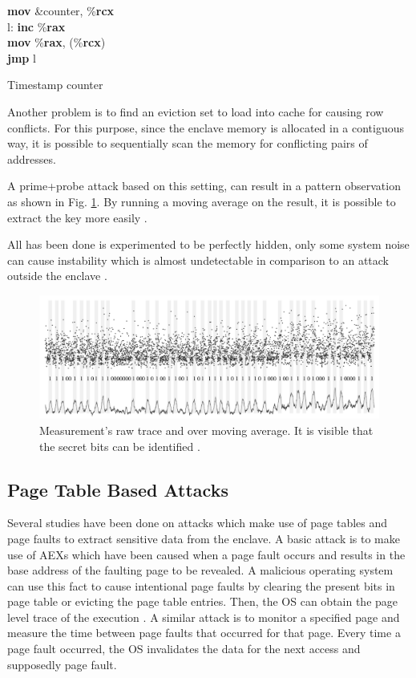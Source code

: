 \begin{algorithm}[t]
	\textbf{mov} \&counter, \%\textbf{rcx}\\
	l: \textbf{inc} \%\textbf{rax}\\
	\textbf{mov} \%\textbf{rax}, (\%\textbf{rcx})\\
	\textbf{jmp} l
	\caption{Timestamp counter \cite{mge}}
	\label{alg:timer}
\end{algorithm}

Another problem is to find an eviction set to load into cache for causing row conflicts. For this purpose, since the enclave memory is allocated in a contiguous way, it is possible to sequentially scan the memory for conflicting pairs of addresses. 

A prime+probe attack based on this setting, can result in a pattern observation as shown in Fig. \ref{fig:ppres}. By running a moving average on the result, it is possible to extract the key more easily \cite{mge}.

All has been done is experimented to be perfectly hidden, only some system noise can cause instability which is almost undetectable in comparison to an attack outside the enclave \cite{mge}.

\begin{figure}
	\includegraphics[scale=0.2]{images/ppres}
	\caption{Measurement's raw trace and over moving average. It is visible that the secret bits can be identified \cite{mge}.}
	\label{fig:ppres}
\end{figure}

\subsection{Page Table Based Attacks}
Several studies have been done on attacks which make use of page tables and page faults to extract sensitive data from the enclave. A basic attack is to make use of AEXs which have been caused when a page fault occurs and results in the base address of the faulting page to be revealed. A malicious operating system can use this fact to cause intentional page faults by clearing the present bits in page table or evicting the page table entries. Then, the OS can obtain the page level trace of the execution \cite{stealthy}. A similar attack is to monitor a specified page and measure the time between page faults that occurred for that page. Every time a page fault occurred, the OS invalidates the data for the next access and supposedly page fault.

